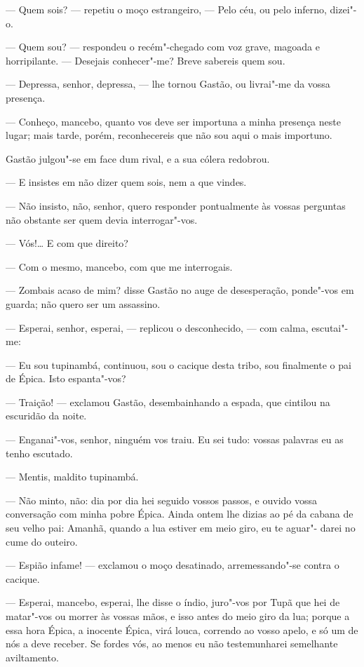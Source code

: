 --- Quem sois? --- repetiu o moço estrangeiro, --- Pelo céu, ou pelo
inferno, dizei"-o.

--- Quem sou? --- respondeu o recém"-chegado com voz grave, magoada e
horripilante. --- Desejais conhecer"-me? Breve sabereis quem sou.

--- Depressa, senhor, depressa, --- lhe tornou Gastão, ou livrai"-me da
vossa presença.

--- Conheço, mancebo, quanto vos deve ser importuna a minha presença
neste lugar; mais tarde, porém, reconhecereis que não sou aqui o mais
importuno.

Gastão julgou"-se em face dum rival, e a sua cólera redobrou.

--- E insistes em não dizer quem sois, nem a que vindes.

--- Não insisto, não, senhor, quero responder pontualmente às vossas
perguntas não obstante ser quem devia interrogar"-vos.

--- Vós!\ldots{} E com que direito?

--- Com o mesmo, mancebo, com que me interrogais.

--- Zombais acaso de mim? disse Gastão no auge de desesperação,
ponde"-vos em guarda; não quero ser um assassino.

--- Esperai, senhor, esperai, --- replicou o desconhecido, --- com calma,
escutai"-me:

--- Eu sou tupinambá, continuou, sou o cacique desta tribo, sou
finalmente o pai de Épica. Isto espanta"-vos?

--- Traição! --- exclamou Gastão, desembainhando a espada, que cintilou
na escuridão da noite.

--- Enganai"-vos, senhor, ninguém vos traiu. Eu sei tudo: vossas palavras
eu as tenho escutado.

--- Mentis, maldito tupinambá.

--- Não minto, não: dia por dia hei seguido vossos passos, e ouvido
vossa conversação com minha pobre Épica. Ainda ontem lhe dizias ao pé da
cabana de seu velho pai: Amanhã, quando a lua estiver em meio giro, eu
te aguar"- darei no cume do outeiro.

--- Espião infame! --- exclamou o moço desatinado, arremessando"-se contra
o cacique.

--- Esperai, mancebo, esperai, lhe disse o índio, juro"-vos por Tupã que
hei de matar"-vos ou morrer às vossas mãos, e isso antes do meio giro da
lua; porque a essa hora Épica, a inocente Épica, virá louca, correndo ao
vosso apelo, e só um de nós a deve receber. Se fordes vós, ao menos eu
não testemunharei semelhante aviltamento.

